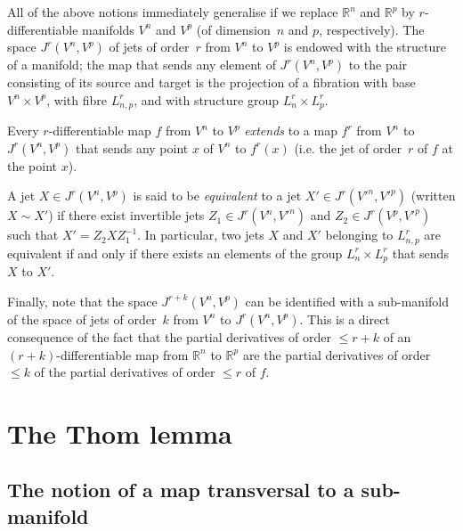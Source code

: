 \documentclass{article}
\theoremstyle{plain}
\theoremstyle{definition}
\newcommand{\RR}{\mathbb{R}}
\renewcommand{\leq}{\leqslant}
\newcommand{\oldpage}[1]{\marginpar{\footnotesize$\Big\vert$ \textit{p.~#1}}}
\begin{document}
All of the above notions immediately generalise if we replace $\RR^n$ and $\RR^p$ by $r$-differentiable manifolds $V^n$ and $V^p$ (of dimension~$n$ and $p$, respectively).
The space $J^r(V^n,V^p)$ of jets of order~$r$ from $V^n$ to $V^p$ is endowed with the structure of a manifold;
the map that sends any element of $J^r(V^n,V^p)$ to the pair consisting of its source and target is the projection of a fibration with base $V^n\times V^p$, with fibre $L_{n,p}^r$, and with structure group $L_n^r\times L_p^r$.

Every $r$-differentiable map $f$ from $V^n$ to $V^p$ \emph{extends} to a map $f^r$ from $V^n$ to $J^r(V^n,V^p)$ that sends any point $x$ of $V^n$ to $f^r(x)$ (i.e. the jet of order~$r$ of $f$ at the point $x$).

A jet $X\in J^r(V^n,V^p)$ is said to be \emph{equivalent} to a jet $X'\in J^r(V'^n,V'^p)$ (written $X\sim X'$) if there exist invertible jets $Z_1\in J^r(V^n,V'^n)$ and $Z_2\in J^r(V^p,V'^p)$ such that $X'=Z_2XZ_1^{-1}$.
In particular, two jets $X$ and $X'$ belonging to $L_{n,p}^r$ are equivalent if and only if there exists an elements of the group $L_n^r\times L_p^r$ that sends $X$ to $X'$.

Finally, note that the space $J^{r+k}(V^n,V^p)$ can be identified with a sub-manifold of the space of jets of order~$k$ from $V^n$ to $J^r(V^n,V^p)$.
This is a direct consequence of the fact that the partial derivatives of order $\leq r+k$ of an $(r+k)$-differentiable map from $\RR^n$ to $\RR^p$ are the partial derivatives of order $\leq k$ of the partial derivatives of order $\leq r$ of $f$.


\section{The Thom lemma}
\label{section2}

\subsection*{The notion of a map transversal to a sub-manifold}

\oldpage{7-03}



\nocite{*}
\end{document}
